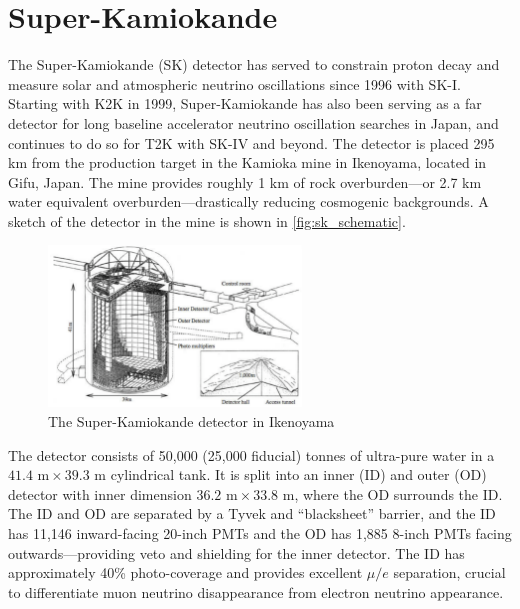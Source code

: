 \section{Super-Kamiokande}
\label{sec:sk}
The Super-Kamiokande (SK)\cite{t2k_sk, t2k_sk2, t2k_sk3} detector has served to constrain proton decay and measure solar and atmospheric neutrino oscillations since 1996 with SK-I. Starting with K2K in 1999\cite{k2k_design}, Super-Kamiokande has also been serving as a far detector for long baseline accelerator neutrino oscillation searches in Japan, and continues to do so for T2K with SK-IV and beyond. The detector is placed 295 km from the production target in the Kamioka mine in Ikenoyama, located in Gifu, Japan. The mine provides roughly 1 km of rock overburden---or 2.7 km water equivalent overburden---drastically reducing cosmogenic backgrounds. A sketch of the detector in the mine is shown in \autoref{fig:sk_schematic}.
\begin{figure}[h]
	\includegraphics[width=0.6\textwidth, trim={0mm 0mm 0mm 0mm}, clip,page=1]{figures/det_chap/sk/sk.pdf}
	\caption{The Super-Kamiokande detector in Ikenoyama}
	\label{fig:sk_schematic}
\end{figure}

The detector consists of 50,000 (25,000 fiducial) tonnes of ultra-pure water in a $41.4\text{ m}\times39.3\text{ m}$ cylindrical tank. It is split into an inner (ID) and outer (OD) detector with inner dimension $36.2\text{ m}\times33.8\text{ m}$, where the OD surrounds the ID. The ID and OD are separated by a Tyvek and ``blacksheet'' barrier, and the ID has 11,146 inward-facing 20-inch PMTs and the OD has 1,885 8-inch PMTs facing outwards---providing veto and shielding for the inner detector. The ID has approximately 40\% photo-coverage and provides excellent $\mu/e$ separation, crucial to differentiate muon neutrino disappearance from electron neutrino appearance.

